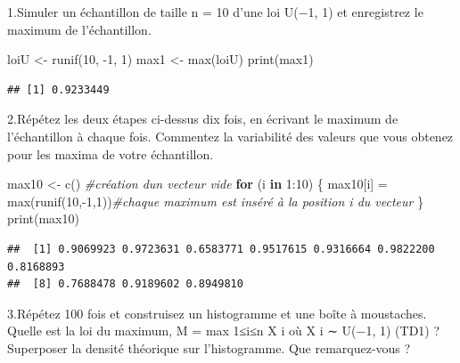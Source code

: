 \documentclass[
]{article}
\newenvironment{Shaded}{\begin{snugshade}}{\end{snugshade}}
\newcommand{\CommentTok}[1]{\textcolor[rgb]{0.56,0.35,0.01}{\textit{#1}}}
\newcommand{\ControlFlowTok}[1]{\textcolor[rgb]{0.13,0.29,0.53}{\textbf{#1}}}
\newcommand{\DecValTok}[1]{\textcolor[rgb]{0.00,0.00,0.81}{#1}}
\newcommand{\FunctionTok}[1]{\textcolor[rgb]{0.00,0.00,0.00}{#1}}
\newcommand{\NormalTok}[1]{#1}
\newcommand{\OtherTok}[1]{\textcolor[rgb]{0.56,0.35,0.01}{#1}}
\newcommand{\SpecialCharTok}[1]{\textcolor[rgb]{0.00,0.00,0.00}{#1}}
\begin{document}
1.Simuler un échantillon de taille n = 10 d'une loi U(−1, 1) et
enregistrez le maximum de l'échantillon.

\begin{Shaded}
\begin{Highlighting}[]
\NormalTok{loiU }\OtherTok{\textless{}{-}} \FunctionTok{runif}\NormalTok{(}\DecValTok{10}\NormalTok{, }\SpecialCharTok{{-}}\DecValTok{1}\NormalTok{, }\DecValTok{1}\NormalTok{)}
\NormalTok{max1 }\OtherTok{\textless{}{-}} \FunctionTok{max}\NormalTok{(loiU)}
\FunctionTok{print}\NormalTok{(max1)}
\end{Highlighting}
\end{Shaded}

\begin{verbatim}
## [1] 0.9233449
\end{verbatim}

2.Répétez les deux étapes ci-dessus dix fois, en écrivant le maximum de
l'échantillon à chaque fois. Commentez la variabilité des valeurs que
vous obtenez pour les maxima de votre échantillon.

\begin{Shaded}
\begin{Highlighting}[]
\NormalTok{max10 }\OtherTok{\textless{}{-}} \FunctionTok{c}\NormalTok{() }\CommentTok{\#création d\textquotesingle{}un vecteur vide}
\ControlFlowTok{for}\NormalTok{ (i }\ControlFlowTok{in} \DecValTok{1}\SpecialCharTok{:}\DecValTok{10}\NormalTok{) \{}
\NormalTok{  max10[i] }\OtherTok{=} \FunctionTok{max}\NormalTok{(}\FunctionTok{runif}\NormalTok{(}\DecValTok{10}\NormalTok{,}\SpecialCharTok{{-}}\DecValTok{1}\NormalTok{,}\DecValTok{1}\NormalTok{))}\CommentTok{\#chaque maximum est inséré à la position i du vecteur}
\NormalTok{\}}
\FunctionTok{print}\NormalTok{(max10)}
\end{Highlighting}
\end{Shaded}

\begin{verbatim}
##  [1] 0.9069923 0.9723631 0.6583771 0.9517615 0.9316664 0.9822200 0.8168893
##  [8] 0.7688478 0.9189602 0.8949810
\end{verbatim}

3.Répétez 100 fois et construisez un histogramme et une boîte à
moustaches. Quelle est la loi du maximum, M = max 1≤i≤n X i où X i ∼
U(−1, 1) (TD1) ? Superposer la densité théorique sur l'histogramme. Que
remarquez-vous ?
\end{document}
